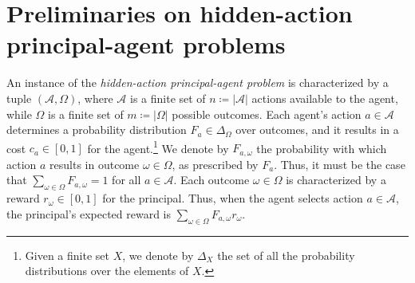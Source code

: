 \section{Preliminaries on hidden-action principal-agent problems}\label{sec:preliminaries}
%




An instance of the \emph{hidden-action principal-agent problem} is characterized by a tuple $\left(\mathcal{A},\Omega\right)$, where $\mathcal{A}$ is a finite set of $n \coloneqq |\mathcal{A}|$ actions available to the agent, while $\Omega$ is a finite set of $m \coloneqq |\Omega|$ possible outcomes.
%
Each agent's action $a \in \mathcal{A}$ determines a probability distribution $F_a \in \Delta_{\Omega}$ over outcomes, and it results in a cost $ c_a \in [0, 1]$ for the agent.\footnote{Given a finite set $X$, we denote by $\Delta_X$ the set of all the probability distributions over the elements of $X$.}
%
We denote by $F_{a,\omega}$ the probability with which action $a$ results in outcome $\omega \in \Omega$, as prescribed by $F_a$.
%
Thus, it must be the case that $\sum_{\omega \in \Omega}F_{a,\omega}=1$ for all $a \in \mathcal{A}$.
%
Each outcome $\omega \in \Omega$ is characterized by a reward $r_\omega \in [0,1]$ for the principal.
%
Thus, when the agent selects action $a \in \mathcal{A}$, the principal's expected
reward is $\sum_{\omega \in \Omega}F_{a,\omega}r_{\omega}$. 


